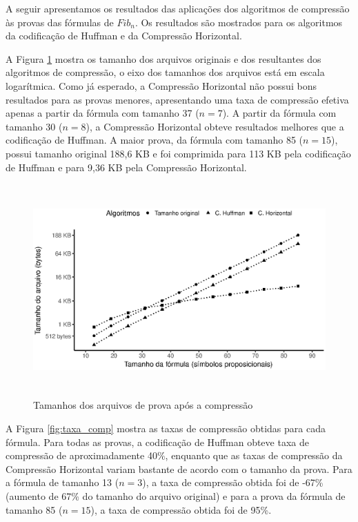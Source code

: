 A seguir apresentamos os resultados das aplicações dos algoritmos de compressão às provas das fórmulas de $Fib_n$. Os resultados são mostrados para os algoritmos da codificação de Huffman e da Compressão Horizontal.

A Figura \ref{fig:prova_alg_sizes} mostra os tamanho dos arquivos originais e dos resultantes dos algoritmos de compressão, o eixo dos tamanhos dos arquivos está em escala logarítmica. Como já esperado, a Compressão Horizontal não possui bons resultados para as provas menores, apresentando uma taxa de compressão efetiva apenas a partir da fórmula com tamanho 37 ($n = 7$). A partir da fórmula com tamanho 30 ($n = 8$), a Compressão Horizontal obteve resultados melhores que a codificação de Huffman. A maior prova, da fórmula com tamanho 85 ($n = 15$), possui tamanho original 188,6 KB e foi comprimida para 113 KB pela codificação de Huffman e para 9,36 KB pela Compressão Horizontal.

\begin{figure}[H]
  \begin{center}
    \includegraphics[height=230pt,width=400pt]{images/plot_alg_sizes.eps}
    \caption{Tamanhos dos arquivos de prova após a compressão}
    \label{fig:prova_alg_sizes}
  \end{center}
\end{figure}

A Figura \ref{fig:taxa_comp} mostra as taxas de compressão obtidas para cada fórmula. Para todas as provas, a codificação de Huffman obteve taxa de compressão de aproximadamente 40\%, enquanto que as taxas de compressão da Compressão Horizontal variam bastante de acordo com o tamanho da prova. Para a fórmula de tamanho 13 ($n = 3$), a taxa de compressão obtida foi de -67\% (aumento de 67\% do tamanho do arquivo original) e para a prova da fórmula de tamanho 85 ($n = 15$), a taxa de compressão obtida foi de 95\%.

